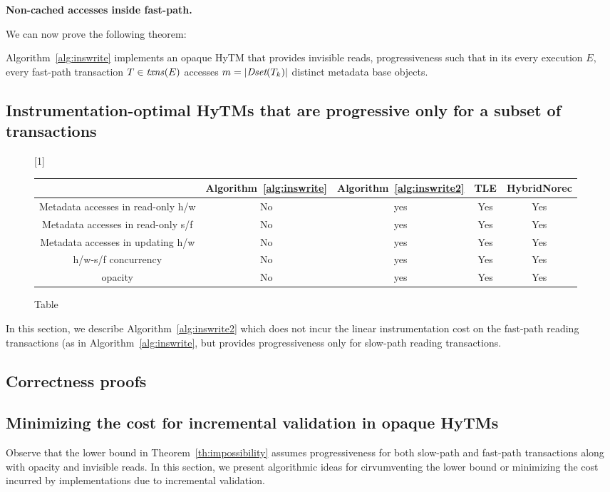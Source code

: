 \vspace{1mm}\noindent\textbf{Non-cached accesses inside fast-path.}

We can now prove the following theorem:
%
\begin{theorem}
\label{th:inswrite}
Algorithm~\ref{alg:inswrite} implements an opaque HyTM that provides invisible reads, progressiveness
such that in its every execution $E$, every fast-path transaction $T\in \ms{txns}(E)$
accesses $m=|\textit{Dset}(T_k)|$ distinct metadata base objects.
\end{theorem}
%
\subsection{Instrumentation-optimal HyTMs that are progressive only for a subset of transactions}
\label{sec:hytm2}
%
\begin{figure*}[!ht]
      
     \scalebox{1}[1]{
     \begin{tabularx}{\textwidth}{c|c|c|c|c}
	~~~~~ & Algorithm~\ref{alg:inswrite} & Algorithm~\ref{alg:inswrite2} & TLE & HybridNorec\\ \hline
	Metadata accesses in read-only h/w & No & yes & Yes & Yes \\ \hline
	Metadata accesses in read-only s/f & No & yes & Yes & Yes \\ \hline
	Metadata accesses in updating h/w & No & yes & Yes & Yes \\ \hline
	h/w-s/f concurrency & No & yes & Yes & Yes \\ \hline
	opacity & No & yes & Yes & Yes \\  \hline
   \end{tabularx}
\caption{Table}\label{fig:main}    
}
\end{figure*}
%
In this section, we describe Algorithm~\ref{alg:inswrite2} which does not incur the linear instrumentation cost
on the fast-path reading transactions (as in Algorithm~\ref{alg:inswrite}, but provides progressiveness only
for slow-path reading transactions.
%
\subsection{Correctness proofs}
\label{sec:proofs}
%


%
\subsection{Minimizing the cost for incremental validation in opaque HyTMs}
\label{sec:middlepath}
%
%
Observe that the lower bound in Theorem~\ref{th:impossibility} assumes progressiveness for both slow-path and fast-path transactions
along with opacity and invisible reads.
In this section, we present algorithmic ideas for cirvumventing the lower bound or minimizing the cost incurred
by implementations due to incremental validation.

